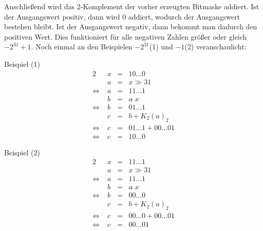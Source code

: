 \documentclass[10pt,a4paper,oneside,ngerman,numbers=noenddot]{scrartcl}
\begin{document}
Anschließend wird das 2-Komplement der vorher erzeugten Bitmaske addiert. Ist der Ausgangswert positiv, dann wird $0$ addiert, wodurch der Ausgangswert bestehen bleibt. Ist der Ausgangswert negativ, dann bekommt man dadurch den positiven Wert. Dies funktioniert für alle negativen Zahlen größer oder gleich $-2^{31}+1$. Noch einmal an den Beispielen $-2^{31}$(1) und $-1$(2) veranschaulicht:

Beispiel (1)
\begin{alignat*}{2}
&\; x &=& 10...0 \\
&\; a &=& x \gg 31 \\
\Leftrightarrow &\; a &=& 11...1 \\
&\; b &=& a \, \hat{}\, x \\
\Leftrightarrow &\; b &=& 01...1 \\
&\; c &=& b + K_{2}(a)_{2} \\
\Leftrightarrow &\; c &=& 01...1 + 00...01 \\
\Leftrightarrow &\; c &=& 10...0
\end{alignat*}

Beispiel (2)
\begin{alignat*}{2}
&\; x &=& 11...1 \\
&\; a &=& x \gg 31 \\
\Leftrightarrow &\; a &=& 11...1 \\
&\; b &=& a \, \hat{}\, x \\
\Leftrightarrow &\; b &=& 00...0 \\
&\; c &=& b + K_{2}(a)_{2} \\
\Leftrightarrow &\; c &=& 00...0 + 00...01 \\
\Leftrightarrow &\; c &=& 00...01
\end{alignat*}
\end{document}
